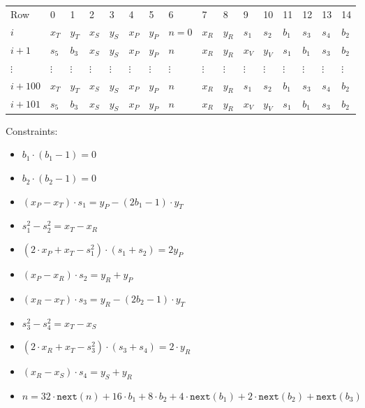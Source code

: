 \begin{center}
\begin{table}[H]
\begin{tabular}{llllllllllllllll}
 Row 		& 0 & 1 & 2 & 3 & 4 & 5 & 6 & 7 & 8 & 9 & 10 & 11 & 12 & 13 & 14 \\
 $i$ 			& $x_T$ & $y_T$ & $x_S$ & $y_S$ & $x_P$ & $y_P$ & $n=0$ & $x_R$ & $y_R$ & $s_1$ & $s_2$ & $b_1$ & $s_3$ & $s_4$ & $b_2$ \\
 $i + 1$	& $s_5$ & $b_3$ & $x_S$ & $y_S$ & $x_P$ & $y_P$ & $n$ & $x_R$ & $y_R$ & $x_V$ & $y_V$ & $s_1$ & $b_1$ & $s_3$ & $b_2$ \\
 $\vdots$	& $\vdots$ & $\vdots$ & $\vdots$ & $\vdots$ & $\vdots$ & $\vdots$ & $\vdots$ & $\vdots$ & $\vdots$ & $\vdots$ & $\vdots$ & $\vdots$ & $\vdots$ & $\vdots$ & $\vdots$ \\
 $i + 100$	& $x_T$ & $y_T$ & $x_S$ & $y_S$ & $x_P$ & $y_P$ & $n$ & $x_R$ & $y_R$ & $s_1$ & $s_2$ & $b_1$ & $s_3$ & $s_4$ & $b_2$ \\
 $i + 101$	& $s_5$ & $b_3$ & $x_S$ & $y_S$ & $x_P$ & $y_P$ & $n$ & $x_R$ & $y_R$ & $x_V$ & $y_V$ & $s_1$ & $b_1$ & $s_3$ & $b_2$ \\
\end{tabular}
\end{table}
\end{center}

Constraints:
\begin{itemize}
	\item $b_1 \cdot (b_1 - 1) = 0$
	\item $b_2 \cdot (b_2 - 1) = 0$
	\item $(x_P - x_T) \cdot s_1 = y_P - (2b_1 - 1) \cdot y_T$
	\item $s_1^2 - s_2^2 = x_T - x_R$
	\item $(2 \cdot x_P + x_T - s_1^2) \cdot (s_1 + s_2) = 2y_P$
	\item $(x_P - x_R) \cdot s_2 = y_R + y_P$
	\item $(x_R - x_T) \cdot s_3 = y_R - (2b_2 - 1) \cdot y_T$
	\item $s_3^2 - s_4^2 = x_T - x_S$
	\item $(2 \cdot x_R + x_T - s_3^2) \cdot (s_3 + s_4) = 2 \cdot y_R$
	\item $(x_R - x_S) \cdot s_4 = y_S + y_R$
	\item $n = 32 \cdot \texttt{next}(n) + 16 \cdot b_1 + 8 \cdot b_2 + 4 \cdot \texttt{next}(b_1) + 2 \cdot \texttt{next}(b_2) + \texttt{next}(b_3)$
\end{itemize}

